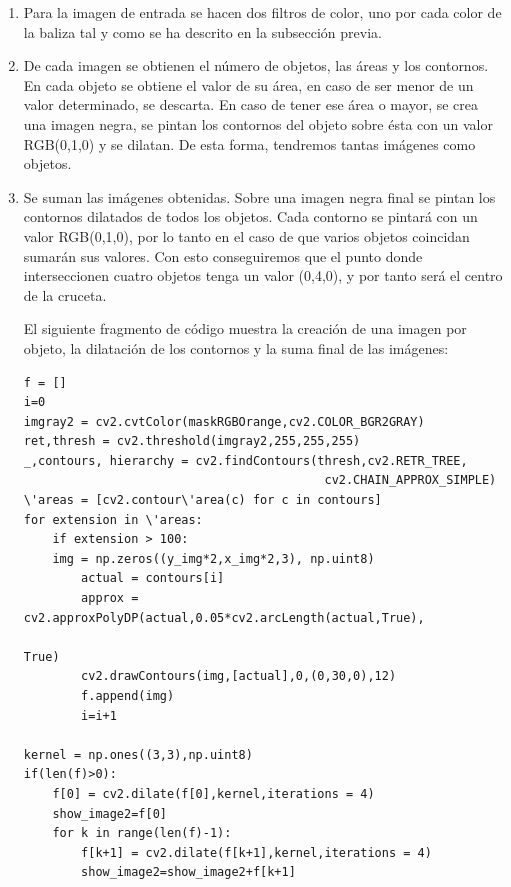 \begin{enumerate}
	\item Para la imagen de entrada se hacen dos filtros de color, uno por cada color de la baliza tal y como se ha descrito en la subsecci\'on previa.
	\item De cada imagen se obtienen el n\'umero de objetos, las \'areas y los contornos. En cada objeto se obtiene el valor de su \'area, en caso de ser menor de un valor determinado, se descarta. En caso de tener ese \'area o mayor, se crea una imagen negra, se pintan los contornos del objeto sobre \'esta con un valor RGB(0,1,0) y se dilatan. De esta forma, tendremos tantas im\'agenes como objetos. 
	\item Se suman las im\'agenes obtenidas. Sobre una imagen negra final se pintan los contornos dilatados de todos los objetos. Cada contorno se pintar\'a con un valor RGB(0,1,0), por lo tanto en el caso de que varios objetos coincidan sumar\'an sus valores. Con esto conseguiremos que el punto donde interseccionen cuatro objetos tenga un valor (0,4,0), y por tanto ser\'a el centro de la cruceta.
	
\hspace{1 cm}El siguiente fragmento de c\'odigo muestra la creaci\'on de una imagen por objeto, la dilataci\'on de los contornos y la suma final de las im\'agenes:

\begin{lstlisting}[backgroundcolor=\color{yellow}]
f = []
i=0
imgray2 = cv2.cvtColor(maskRGBOrange,cv2.COLOR_BGR2GRAY)
ret,thresh = cv2.threshold(imgray2,255,255,255)
_,contours, hierarchy = cv2.findContours(thresh,cv2.RETR_TREE,
                                          cv2.CHAIN_APPROX_SIMPLE)
\'areas = [cv2.contour\'area(c) for c in contours]
for extension in \'areas:
    if extension > 100:
    img = np.zeros((y_img*2,x_img*2,3), np.uint8)
        actual = contours[i]
        approx = cv2.approxPolyDP(actual,0.05*cv2.arcLength(actual,True),
                                                                       True)
        cv2.drawContours(img,[actual],0,(0,30,0),12)
        f.append(img)
        i=i+1
			
kernel = np.ones((3,3),np.uint8)
if(len(f)>0):
    f[0] = cv2.dilate(f[0],kernel,iterations = 4)
    show_image2=f[0]
    for k in range(len(f)-1):
        f[k+1] = cv2.dilate(f[k+1],kernel,iterations = 4)
        show_image2=show_image2+f[k+1]
		
\end{lstlisting}



\end{enumerate}

